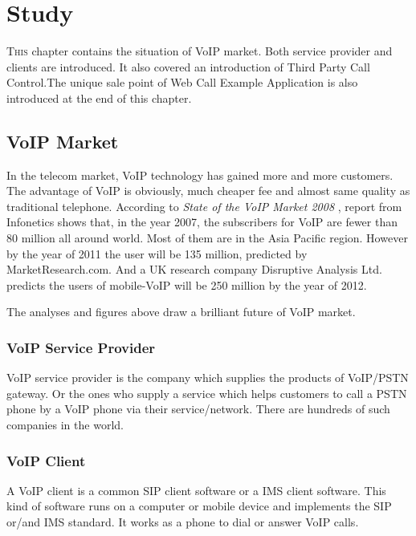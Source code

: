 \chapter{Study}
\label{sec:BackgroundStudy}

\lettrine[lines=3]{T}{his} chapter contains the situation of VoIP market. Both service provider and clients are introduced. It also covered an introduction of Third Party Call Control.The unique sale point of \textsf{Web Call Example Application} is also introduced at the end of this chapter.

\section{VoIP Market}
\label{sec:BackgroundStudy:VoIPMarket}

In the telecom market, VoIP technology has gained more and more customers. The advantage of VoIP is obviously, much cheaper fee and almost same quality as traditional telephone. According to \textit{State of the VoIP Market 2008} \cite{StateOfTheVoIPMarket2008}, report from \textsf{Infonetics} shows that, in the year 2007, the subscribers for VoIP are fewer than 80 million all around world. Most of them are in the Asia Pacific region. However by the year of 2011 the user will be 135 million, predicted by \textsf{MarketResearch.com}. And a UK research company \textsf{Disruptive Analysis Ltd.} predicts the users of mobile-VoIP will be 250 million by the year of 2012.

The analyses and figures above draw a brilliant future of VoIP market.  

\subsection{VoIP Service Provider}
\label{sec:BackgroundStudy:VoIPMarket:VoIPServiceProvider}

VoIP service provider is the company which supplies the products of VoIP/PSTN gateway. Or the ones who supply a service which helps customers to call a PSTN phone by a VoIP phone via their service/network. There are hundreds of such companies in the world. 


\subsection{VoIP Client}
\label{sec:BackgroundStudy:VoIPMarket:VoIPClient}

A VoIP client is a common SIP client software or a IMS client software. This kind of software runs on a computer or mobile device and implements the SIP or/and IMS standard. It works as a phone to dial or answer VoIP calls.  

